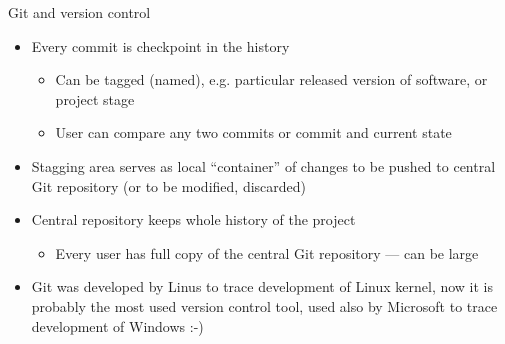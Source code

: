 \documentclass[compress, xelatex, 11pt, xcolor=svgnames, aspectratio=169,
	hyperref={
		bookmarks=true,
		unicode=true,
		colorlinks=true,
		pdftitle={Linux, command line and MetaCentrum},
		plainpages=false,
		pdfauthor={Vojtech Zeisek},
		pdfsubject={Course about use of Linux command line, writing shell scripts and using MetaCentrum of CESNET},
		pdfcreator={XeLaTeX},
		pdfkeywords={Linux, GNU, BASH, shell, command line, MetaCentrum},
		linkcolor=DarkRed, %
		anchorcolor=DarkBlue, %
		citecolor=Indigo, %
		filecolor=NavyBlue, %
		menucolor=DarkMagenta, %
		urlcolor=DarkBlue, %
		},
	url={hyphens, lowtilde} %
	]{beamer}
\begin{document}
\begin{frame}[allowframebreaks]{Git and version control}
\begin{itemize}
		\item Every commit is checkpoint in the history
		\begin{itemize}
			\item Can be tagged (named), e.g. particular released version of software, or project stage
			\item User can compare any two commits or commit and current state
		\end{itemize}
		\item Stagging area serves as local \enquote{container} of changes to be pushed to central Git repository (or to be modified, discarded)
		\item Central repository keeps whole history of the project
		\begin{itemize}
			\item Every user has full copy of the central Git repository --- can be large
		\end{itemize}
		\item Git was developed by Linus to trace development of Linux kernel, now it is probably the most used version control tool, used also by Microsoft to trace development of Windows :-)
	\end{itemize}
\end{frame}
\end{document}
